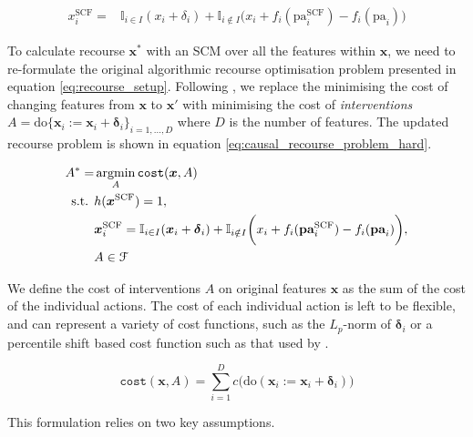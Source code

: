 \begin{align} \label{eq:hard_intervention}
	x^{\text{SCF}}_i = & \mathbb{I}_{i \in I} (x_i + \delta_i) + \mathbb{I}_{i \notin I} \bigg(x_i + f_i(\text{pa}^{\text{SCF}}_i) - f_i(\text{pa}_i)\bigg)
\end{align}


To calculate recourse $\boldsymbol{x}^*$ with an SCM over all the features within $\boldsymbol{x}$, we need to re-formulate the original algorithmic recourse optimisation problem presented in equation \ref{eq:recourse_setup}. Following \textcite{karimiAlgorithmicRecourseCounterfactual2021}, we replace the minimising the cost of changing features from $\boldsymbol{x}$ to $\boldsymbol{x}'$ with minimising the cost of \textit{interventions} $A = \text{do} \{\boldsymbol{x}_i:=\boldsymbol{x}_i + \boldsymbol{\delta}_i\}_{i=1, \ldots, D}$ where $D$ is the number of features. The updated recourse problem is shown in equation \ref{eq:causal_recourse_problem_hard}.

\begin{align} \label{eq:causal_recourse_problem_hard}
	A^* = & \operatorname*{argmin}_{A} \texttt{cost}(\boldsymbol{x}, A) \\ \nonumber
	\text{s.t. } & h(\boldsymbol{x}^{\text{SCF}}) = 1, \\ \nonumber
	& \boldsymbol{x}^{\text{SCF}}_i = \mathbb{I}_{i \in I} (\boldsymbol{x}_i + \boldsymbol{\delta}_i) + \mathbb{I}_{i \notin I} \bigg(x_i + f_i(\textbf{pa}^{\text{SCF}}_i) - f_i(\textbf{pa}_i)\bigg), \\ \nonumber
	& A \in \mathcal{F}
\end{align}

We define the cost of interventions $A$ on original features $\boldsymbol{x}$ as the sum of the cost of the individual actions. The cost of each individual action is left to be flexible, and can represent a variety of cost functions, such as the $L_p$-norm of $\boldsymbol{\delta}_i$ or a percentile shift based cost function such as that used by \textcite{ustunActionableRecourseLinear2019}.

\begin{equation}
	\texttt{cost}(\boldsymbol{x}, A) = \sum_{i=1}^{D} c \bigg(\text{do}(\boldsymbol{x}_i:=\boldsymbol{x}_i + \boldsymbol{\delta}_i) \bigg)
\end{equation}

This formulation relies on two key assumptions.

